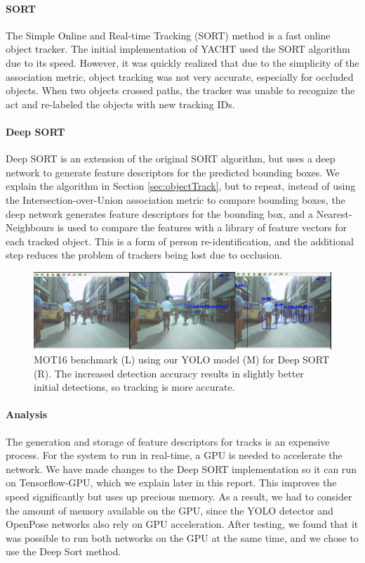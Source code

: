 \paragraph{SORT}  The Simple Online and Real-time Tracking (SORT) method is a fast online object tracker. The initial implementation of YACHT used the SORT algorithm due to its speed. However, it was quickly realized that due to the simplicity of the association metric, object tracking was not very accurate, especially for occluded objects. When two objects crossed paths, the tracker was unable to recognize the act and re-labeled the objects with new tracking IDs.

\paragraph{Deep SORT} Deep SORT is an extension of the original SORT algorithm, but uses a deep network to generate feature descriptors for the predicted bounding boxes. We explain the algorithm in Section \ref{sec:objectTrack}, but to repeat, instead of using the Intersection-over-Union association metric to compare bounding boxes, the deep network generates feature descriptors for the bounding box, and a Nearest-Neighbours is used to compare the features with a library of feature vectors for each tracked object. This is a form of person re-identification, and the additional step reduces the problem of trackers being lost due to occlusion.

\begin{figure}[ht]
    \centering
    \includegraphics[width=1.0\linewidth]{img/chapter4_analysis/deepSortMOT.png}
    \caption{MOT16 benchmark \cite{Milan} (L) using our YOLO model (M) for Deep SORT (R). The increased detection accuracy results in slightly better initial detections, so tracking is more accurate.}
    \label{fig:deepSortMOT}
    \vspace{-1\baselineskip}
\end{figure}

\paragraph{Analysis} The generation and storage of feature descriptors for tracks is an expensive process. For the system to run in real-time, a GPU is needed to accelerate the network. We have made changes to the Deep SORT implementation so it can run on Tensorflow-GPU, which we explain later in this report. This improves the speed significantly but uses up precious memory. As a result, we had to consider the amount of memory available on the GPU, since the YOLO detector and OpenPose networks also rely on GPU acceleration. After testing, we found that it was possible to run both networks on the GPU at the same time, and we chose to use the Deep Sort method.

